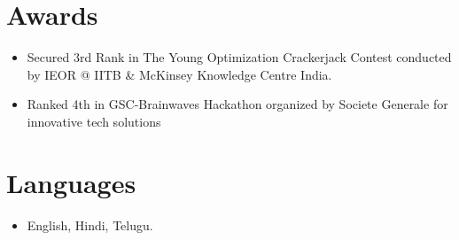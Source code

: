 \documentclass[letterpaper,11pt]{article}
\newcommand{\resumeSubHeadingListStart}{\begin{itemize}[leftmargin=*]}
\newcommand{\resumeSubHeadingListEnd}{\end{itemize}}
\begin{document}
\section{Awards}
  \resumeSubHeadingListStart
    \item{ {Secured 3rd Rank in The Young Optimization Crackerjack Contest conducted by IEOR @ IITB \& McKinsey Knowledge Centre India.} }
    \item{ {Ranked 4th in GSC-Brainwaves Hackathon organized by Societe Generale for innovative tech solutions} }
  \resumeSubHeadingListEnd

\section{Languages}
  \resumeSubHeadingListStart
    \item{ {English, Hindi, Telugu.} }
  \resumeSubHeadingListEnd

\end{document}
